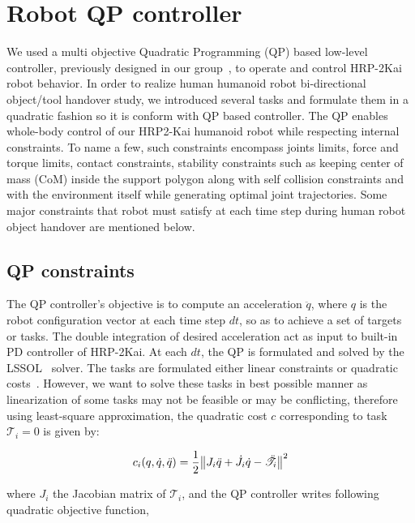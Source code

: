 
\section{Robot QP controller}\label{QPController}

We used a multi objective Quadratic Programming (QP) based low-level controller, previously designed in our group~\cite{ladder-HRP-2Kai}, to operate and control HRP-2Kai robot behavior. In order to realize human humanoid robot bi-directional object/tool handover study, we introduced several tasks and formulate them in a quadratic fashion so it is conform with QP based controller. The QP enables whole-body control of our HRP2-Kai humanoid robot while respecting internal constraints. To name a few, such constraints encompass joints limits, force and torque limits, contact constraints, stability constraints such as keeping center of mass (CoM) inside the support polygon along with self collision constraints and with the environment itself while generating optimal joint trajectories. Some major constraints that robot must satisfy at each time step during human robot object handover are mentioned below.


\subsection{QP constraints}\label{QPConstraints}
The QP controller's objective is to compute an acceleration $\ddot{q}$, where $q$ is the robot configuration vector at each time step $dt$, so as to achieve a set of targets or tasks. The double integration of desired acceleration act as input to built-in PD controller of HRP-2Kai. At each $dt$, the QP is formulated and solved by the LSSOL~\cite{gill1986fortran} solver. The tasks are formulated either linear constraints or quadratic costs~\cite{ladder-HRP-2Kai, pfeiffer2017nut}. However, we want to solve these tasks in best possible manner as linearization of some tasks may not be feasible or may be conflicting, therefore using least-square approximation, the quadratic cost $c$ corresponding to task $\mathscr{T}_i =0$ is given by:

\begin{equation}
c_i(q,\dot{q}, \ddot{q})  = \frac{1}{2}{\norm{ J_i\ddot{q} + \dot{J}_i\dot{q} -\ddot{\mathscr{T}}_i }^2 }
\end{equation}

where $J_i$ the Jacobian matrix of $\mathscr{T}_i$, and the QP controller writes following quadratic objective function,

